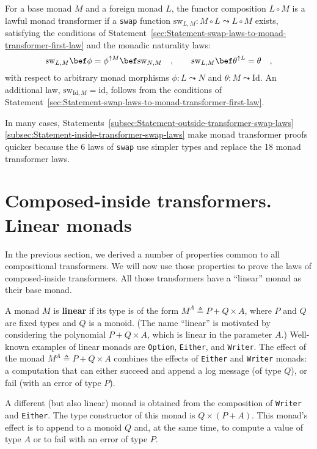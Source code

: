 For a base monad $M$ and a foreign monad $L$, the functor composition
$L\circ M$ is a lawful monad transformer if a \lstinline!swap! function
$\text{sw}_{L,M}:M\circ L\leadsto L\circ M$ exists, satisfying the
conditions of Statement~\ref{sec:Statement-swap-laws-to-monad-transformer-first-law}
and the monadic naturality laws:
\[
\text{sw}_{L,M}\bef\phi=\phi^{\uparrow M}\bef\text{sw}_{N,M}\quad,\quad\quad\text{sw}_{L,M}\bef\theta^{\uparrow L}=\theta\quad,
\]
with respect to arbitrary monad morphisms $\phi:L\leadsto N$ and
$\theta:M\leadsto\text{Id}$. An additional law, $\text{sw}_{\text{Id},M}=\text{id}$,
follows from the conditions of Statement~\ref{sec:Statement-swap-laws-to-monad-transformer-first-law}.

In many cases, Statements~\ref{subsec:Statement-outside-transformer-swap-laws}\textendash \ref{subsec:Statement-inside-transformer-swap-laws}
make monad transformer proofs quicker because the 6 laws of \lstinline!swap!
use simpler types and replace the 18 monad transformer laws.

\section{Composed-inside transformers. Linear monads\label{sec:transformers-linear-monads}}

In the previous section, we derived a number of properties common
to all compositional transformers. We will now use those properties
to prove the laws of composed-inside transformers. All those transformers
have a \textsf{``}linear\textsf{''} monad as their base monad.

A monad $M$ is\textbf{ linear} if its type
is of the form $M^{A}\triangleq P+Q\times A$, where $P$ and $Q$
are fixed types and $Q$ is a monoid. (The name \textsf{``}linear\textsf{''} is motivated
by considering the polynomial $P+Q\times A$, which is linear in the
parameter $A$.) Well-known examples of linear monads are \lstinline!Option!,
\lstinline!Either!, and \lstinline!Writer!. The effect of the monad
$M^{A}\triangleq P+Q\times A$ combines the effects of \lstinline!Either!
and \lstinline!Writer! monads: a computation that can either succeed
and append a log message (of type $Q$), or fail (with an error of
type $P$).

A different (but also linear) monad is obtained from the composition
of \lstinline!Writer! and \lstinline!Either!. The type constructor
of this monad is $Q\times\left(P+A\right)$. This monad\textsf{'}s effect is
to append to a monoid $Q$ and, at the same time, to compute a value
of type $A$ or to fail with an error of type $P$.

